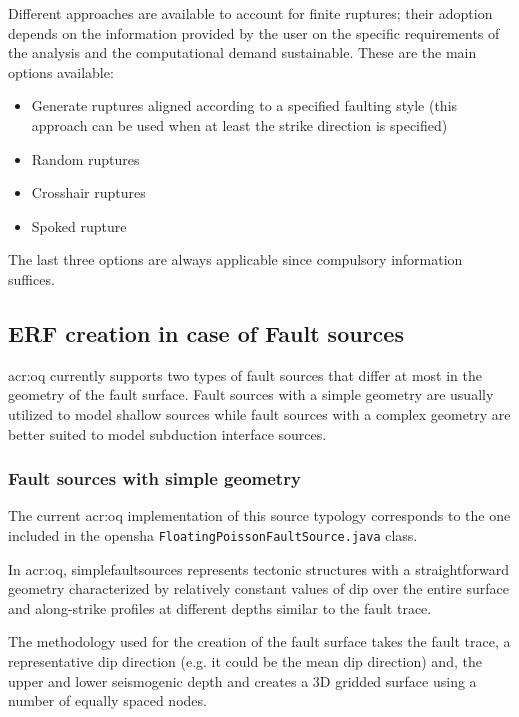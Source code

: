 Different approaches are available to account for finite ruptures;
their adoption depends on the information provided by the user on
the specific requirements of the analysis and the computational demand
sustainable. 
%
These are the main options available:
\begin{itemize}
	\item Generate ruptures aligned according to a specified faulting style 
	(this approach can be used when at least the strike direction is 
	specified)
	\item Random ruptures 
	\item Crosshair ruptures
	\item Spoked rupture
\end{itemize}
The last three options are always applicable since compulsory information 
suffices.
%
\subsection{ERF creation in case of Fault sources}
\gls{acr:oq} currently supports two types of fault sources that 
differ at most in the geometry of the fault surface. 
%
Fault sources with a simple geometry are usually utilized to model 
shallow sources while fault sources with a complex geometry are 
better suited to model subduction interface sources.
%
\subsubsection{Fault sources with simple geometry}
%
The current \gls{acr:oq} implementation of this source typology 
corresponds to the one included in the \gls{opensha}
\texttt{FloatingPoissonFaultSource.java} class.

In \gls{acr:oq}, \glspl{simplefaultsource} represents tectonic structures 
with a straightforward geometry characterized by relatively constant 
values of dip over the entire surface and along-strike profiles at 
different depths similar to the fault trace. 

The methodology used for the creation of the fault surface takes the 
fault trace, a representative dip direction (e.g. it could be the mean 
dip direction) and, the upper and lower seismogenic depth and creates 
a 3D gridded surface using a number of equally spaced nodes. 
%
